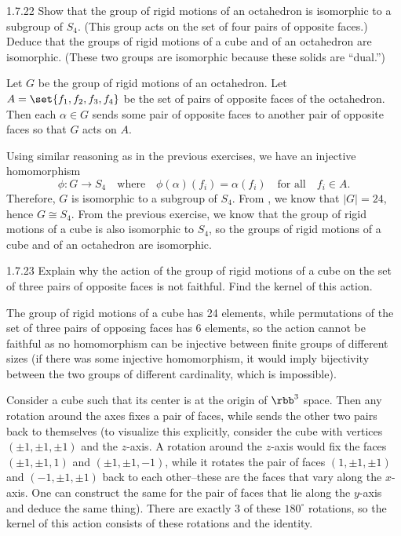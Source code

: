 \begin{exercise}{1.7.22}
    Show that the group of rigid motions of an octahedron is isomorphic to a subgroup of $S_4$.  
    (This group acts on the set of four pairs of opposite faces.) Deduce that the groups of rigid motions of a cube and of an octahedron are isomorphic. (These two groups are isomorphic because these solids are “dual.”)
\end{exercise}

\begin{sol}
    Let $G$ be the group of rigid motions of an octahedron.
	Let $A = \set{f_1, f_2, f_3, f_4}$ be the set of pairs of opposite faces of the octahedron.
	Then each $\alpha \in G$ sends some pair of opposite faces to another pair of opposite faces so that $G$ acts on $A$.

    Using similar reasoning as in the previous exercises, we have an injective homomorphism
    \[
    	\phi : G \to S_4 \quad \text{where} \quad \phi(\alpha)(f_i) = \alpha(f_i) \quad \text{for all} \quad f_i \in A.
    \]
    Therefore, $G$ is isomorphic to a subgroup of $S_4$.
	From , we know that $|G| = 24$, hence $G \cong S_4$.
	From the previous exercise, we know that the group of rigid motions of a cube is also isomorphic to $S_4$, so the groups of rigid motions of a cube and of an octahedron are isomorphic.
\end{sol}

\begin{exercise}{1.7.23}
    Explain why the action of the group of rigid motions of a cube on the set of three pairs of opposite faces is not faithful.
	Find the kernel of this action.
\end{exercise}

\begin{sol}
    The group of rigid motions of a cube has 24 elements, while permutations of the set of three pairs of opposing faces has 6 elements, so the action cannot be faithful as no homomorphism can be injective between finite groups of different sizes (if there was some injective homomorphism, it would imply bijectivity between the two groups of different cardinality, which is impossible).
    
    Consider a cube such that its center is at the origin of $\rbb^3$ space.
	Then any rotation around the axes fixes a pair of faces, while sends the other two pairs back to themselves (to visualize this explicitly, consider the cube with vertices $(\pm 1, \pm 1, \pm 1)$ and the $z$-axis.
	A rotation around the $z$-axis would fix the faces $(\pm 1, \pm 1, 1)$ and $(\pm 1, \pm 1, -1)$, while it rotates the pair of faces $(1, \pm 1, \pm 1)$ and $(-1, \pm 1, \pm 1)$ back to each other--these are the faces that vary along the $x$-axis.
	One can construct the same for the pair of faces that lie along the $y$-axis and deduce the same thing).
	There are exactly 3 of these $180^\circ$ rotations, so the kernel of this action consists of these rotations and the identity.
\end{sol}